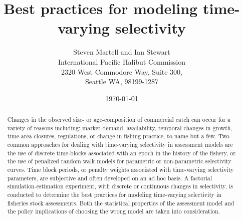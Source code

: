 \documentclass[12pt]{article}
\title{Best practices for modeling time-varying selectivity}
\author{ Steven Martell and Ian Stewart\\ International Pacific Halibut Commission\\ 2320 West Commodore Way, Suite 300,\\ Seattle WA, 98199-1287 }
\date{\today}
\newif\ifpdf
\begin{document}
	
	\ifpdf
	\DeclareGraphicsExtensions{.pdf, .jpg, .tif}
	\else
	\fi
	
	\maketitle
	
	
	\begin{abstract}

    Changes in the observed size- or age-composition of commercial catch can occur for a variety of reasons including: market demand, availability, temporal changes in growth, time-area closures, regulations, or change in fishing practice, to name but a few.  Two common approaches for dealing with time-varying selectivity in assessment models are the use of discrete time-blocks associated with an epoch in the history of the fishery, or the use of penalized random walk models for parametric or non-parametric selectivity curves.  Time block periods, or penalty weights associated with time-varying selectivity parameters, are subjective and often developed on an ad hoc basis. A factorial simulation-estimation experiment, with discrete or continuous changes in selectivity, is conducted to determine the best practices for modeling time-varying selectivity in fisheries stock assessments. Both the statistical properties of the assessment model and the policy implications of choosing the wrong model are taken into consideration.


	

	\end{abstract}
	
	
	
	
	


	
	
	
\end{document}
